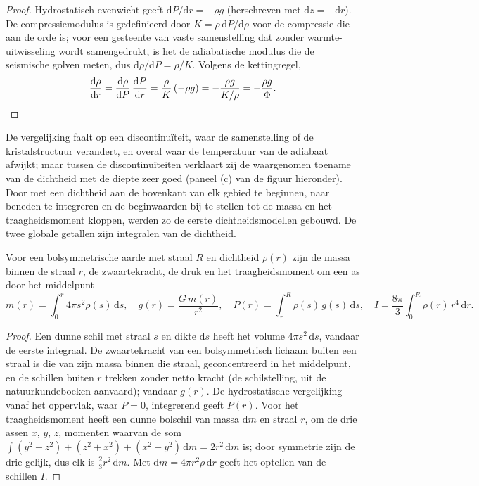 \begin{proof}
Hydrostatisch evenwicht geeft $\mathrm dP/\mathrm dr = -\rho g$ (herschreven met $\mathrm dz = -\mathrm dr$). De compressiemodulus is gedefinieerd door
$K = \rho\,\mathrm dP/\mathrm d\rho$ voor de compressie die aan de orde is; voor een gesteente van vaste samenstelling dat zonder warmte-uitwisseling
wordt samengedrukt, is het de adiabatische modulus die de seismische golven meten, dus $\mathrm d\rho/\mathrm dP = \rho/K$.
Volgens de kettingregel,
\[
  \frac{\mathrm d\rho}{\mathrm dr} = \frac{\mathrm d\rho}{\mathrm dP}\,
  \frac{\mathrm dP}{\mathrm dr} = \frac{\rho}{K}\,(-\rho g) = -\frac{\rho g}{K/\rho}
  = -\frac{\rho g}{\Phi}. \qedhere
\]
\end{proof}

De vergelijking faalt op een discontinuïteit, waar de samenstelling of de kristalstructuur verandert, en overal waar de temperatuur van de adiabaat
afwijkt; maar tussen de discontinuïteiten verklaart zij de waargenomen toename van de dichtheid met de diepte zeer goed (paneel (c) van de figuur
hieronder). Door met een dichtheid aan de bovenkant van elk gebied te beginnen, naar beneden te integreren en de beginwaarden bij te stellen tot de massa en het
traagheidsmoment kloppen, werden zo de eerste dichtheidsmodellen gebouwd. De twee globale getallen zijn integralen van de dichtheid.

\begin{proposition}
\label{prop:b1:layered-earth:integrals}
Voor een bolsymmetrische aarde met straal $R$ en dichtheid $\rho(r)$ zijn de massa binnen de straal $r$, de zwaartekracht, de druk en het traagheidsmoment
om een as door het middelpunt
\[
  m(r) = \int_0^r 4\pi s^2\rho(s)\,\mathrm ds, \quad
  g(r) = \frac{G\,m(r)}{r^2}, \quad
  P(r) = \int_r^R \rho(s)\,g(s)\,\mathrm ds, \quad
  I = \frac{8\pi}{3}\int_0^R \rho(r)\,r^4\,\mathrm dr.
\]
\end{proposition}

\begin{proof}
Een dunne schil met straal $s$ en dikte $\mathrm ds$ heeft het volume $4\pi s^2\,\mathrm ds$, vandaar de eerste integraal. De zwaartekracht van een bolsymmetrisch
lichaam buiten een straal is die van zijn massa binnen die straal, geconcentreerd in het middelpunt, en de schillen buiten $r$ trekken zonder netto kracht
(de schilstelling, uit de natuurkundeboeken aanvaard); vandaar $g(r)$. De hydrostatische vergelijking vanaf het oppervlak, waar $P = 0$, integrerend geeft
$P(r)$. Voor het traagheidsmoment heeft een dunne bolschil van massa $\mathrm dm$ en straal $r$, om de drie assen $x$, $y$, $z$, momenten waarvan de som
$\int (y^2 + z^2) + (z^2 + x^2) + (x^2 + y^2)\,\mathrm dm = 2r^2\,\mathrm dm$ is; door symmetrie zijn de drie gelijk, dus elk is $\tfrac23 r^2\,\mathrm dm$. Met
$\mathrm dm = 4\pi r^2\rho\,\mathrm dr$ geeft het optellen van de schillen $I$.
\end{proof}

